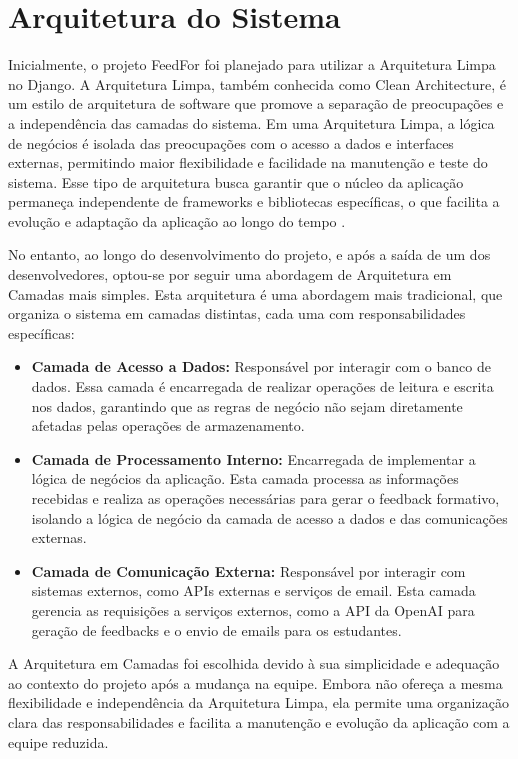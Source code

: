 \section{Arquitetura do Sistema}

Inicialmente, o projeto FeedFor foi planejado para utilizar a Arquitetura Limpa no Django. A Arquitetura Limpa, também conhecida como Clean Architecture, é um estilo de arquitetura de software que promove a separação de preocupações e a independência das camadas do sistema. Em uma Arquitetura Limpa, a lógica de negócios é isolada das preocupações com o acesso a dados e interfaces externas, permitindo maior flexibilidade e facilidade na manutenção e teste do sistema. Esse tipo de arquitetura busca garantir que o núcleo da aplicação permaneça independente de frameworks e bibliotecas específicas, o que facilita a evolução e adaptação da aplicação ao longo do tempo \cite{tabnews2023}.

No entanto, ao longo do desenvolvimento do projeto, e após a saída de um dos desenvolvedores, optou-se por seguir uma abordagem de Arquitetura em Camadas mais simples. Esta arquitetura é uma abordagem mais tradicional, que organiza o sistema em camadas distintas, cada uma com responsabilidades específicas:

\begin{itemize}
    \item \textbf{Camada de Acesso a Dados:} Responsável por interagir com o banco de dados. Essa camada é encarregada de realizar operações de leitura e escrita nos dados, garantindo que as regras de negócio não sejam diretamente afetadas pelas operações de armazenamento.
    \item \textbf{Camada de Processamento Interno:} Encarregada de implementar a lógica de negócios da aplicação. Esta camada processa as informações recebidas e realiza as operações necessárias para gerar o feedback formativo, isolando a lógica de negócio da camada de acesso a dados e das comunicações externas.
    \item \textbf{Camada de Comunicação Externa:} Responsável por interagir com sistemas externos, como APIs externas e serviços de email. Esta camada gerencia as requisições a serviços externos, como a API da OpenAI para geração de feedbacks e o envio de emails para os estudantes.
\end{itemize}

A Arquitetura em Camadas foi escolhida devido à sua simplicidade e adequação ao contexto do projeto após a mudança na equipe. Embora não ofereça a mesma flexibilidade e independência da Arquitetura Limpa, ela permite uma organização clara das responsabilidades e facilita a manutenção e evolução da aplicação com a equipe reduzida.

